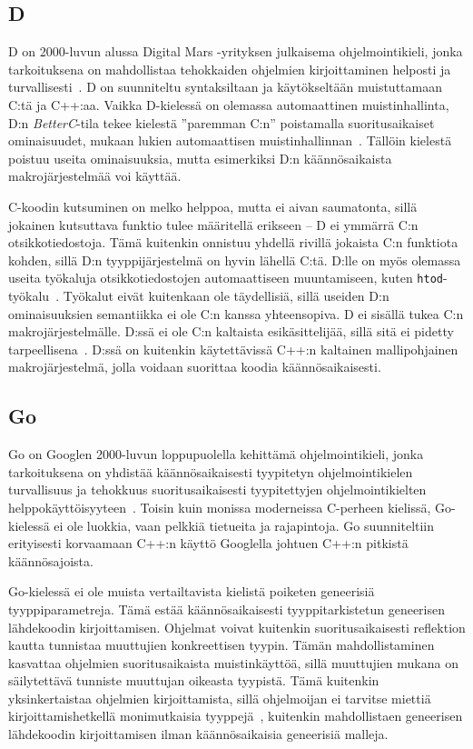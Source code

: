\subsection{D}

D on 2000-luvun alussa Digital Mars -yrityksen julkaisema ohjelmointikieli,
jonka tarkoituksena on mahdollistaa tehokkaiden ohjelmien kirjoittaminen
helposti ja turvallisesti~\citep{dhistory}. D on suunniteltu syntaksiltaan ja
käytökseltään muistuttamaan C:tä ja C++:aa. Vaikka D-kielessä on olemassa
automaattinen muistinhallinta, D:n \emph{BetterC}-tila tekee kielestä
''paremman C:n'' poistamalla suoritusaikaiset ominaisuudet, mukaan lukien
automaattisen muistinhallinnan~\citep{dbetterc}. Tällöin kielestä poistuu
useita ominaisuuksia, mutta esimerkiksi D:n käännösaikaista makrojärjestelmää
voi käyttää.

C-koodin kutsuminen on melko helppoa, mutta ei aivan saumatonta, sillä jokainen
kutsuttava funktio tulee määritellä erikseen -- D ei ymmärrä C:n
otsikkotiedostoja. Tämä kuitenkin onnistuu yhdellä rivillä jokaista C:n
funktiota kohden, sillä D:n tyyppijärjestelmä on hyvin lähellä C:tä. D:lle on
myös olemassa useita työkaluja otsikkotiedostojen automaattiseen muuntamiseen,
kuten \texttt{htod}-työkalu~\citep{htod}. Työkalut eivät kuitenkaan ole
täydellisiä, sillä useiden D:n ominaisuuksien semantiikka ei ole C:n kanssa
yhteensopiva. D ei sisällä tukea C:n makrojärjestelmälle. D:ssä ei ole C:n
kaltaista esikäsittelijää, sillä sitä ei pidetty tarpeellisena~\citep{pretod}.
D:ssä on kuitenkin käytettävissä C++:n kaltainen mallipohjainen
makrojärjestelmä, jolla voidaan suorittaa koodia
käännösaikaisesti\citep{Dtemplate}.

\subsection{Go}

Go on Googlen 2000-luvun loppupuolella kehittämä ohjelmointikieli, jonka
tarkoituksena on yhdistää käännösaikaisesti tyypitetyn ohjelmointikielen
turvallisuus ja tehokkuus suoritusaikaisesti tyypitettyjen ohjelmointikielten
helppokäyttöisyyteen~\citep{gohistory}. Toisin kuin monissa moderneissa
C-perheen kielissä, Go-kielessä ei ole luokkia, vaan pelkkiä tietueita ja
rajapintoja. Go suunniteltiin erityisesti korvaamaan C++:n käyttö Googlella
johtuen C++:n pitkistä käännösajoista.

Go-kielessä ei ole muista vertailtavista kielistä poiketen geneerisiä
tyyppiparametreja. Tämä estää käännösaikaisesti tyyppitarkistetun geneerisen
lähdekoodin kirjoittamisen. Ohjelmat voivat kuitenkin suoritusaikaisesti
reflektion kautta tunnistaa muuttujien konkreettisen tyypin. Tämän
mahdollistaminen kasvattaa ohjelmien suoritusaikaista muistinkäyttöä, sillä
muuttujien mukana on säilytettävä tunniste muuttujan oikeasta tyypistä. Tämä
kuitenkin yksinkertaistaa ohjelmien kirjoittamista, sillä ohjelmoijan ei
tarvitse miettiä kirjoittamishetkellä monimutkaisia
tyyppejä~\citep[esim.][kalvo 8]{gohistory}, kuitenkin mahdollistaen geneerisen
lähdekoodin kirjoittamisen ilman käännösaikaisia geneerisiä malleja.

